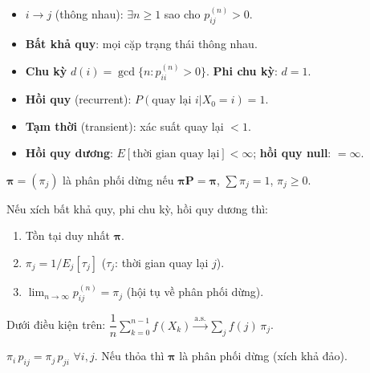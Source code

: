 \documentclass[12pt,a4paper]{article}
\begin{document}
\begin{dinhnghia}[title={Phân loại trạng thái}]
  \begin{itemize}
    \item $i \to j$ (thông nhau): $\exists n \ge 1$ sao cho $p_{ij}^{(n)} > 0$.
    \item \textbf{Bất khả quy}: mọi cặp trạng thái thông nhau.
    \item \textbf{Chu kỳ} $d(i) = \gcd\{n : p_{ii}^{(n)} > 0\}$. \textbf{Phi chu kỳ}: $d = 1$.
    \item \textbf{Hồi quy} (recurrent): $P(\text{quay lại } i | X_0 = i) = 1$.
    \item \textbf{Tạm thời} (transient): xác suất quay lại $< 1$.
    \item \textbf{Hồi quy dương}: $E[\text{thời gian quay lại}] < \infty$; \textbf{hồi quy null}: $= \infty$.
  \end{itemize}
\end{dinhnghia}

\begin{dinhly}[title={Phân phối dừng (stationary distribution)}]
  $\boldsymbol{\pi} = (\pi_j)$ là phân phối dừng nếu $\boldsymbol{\pi}\mathbf{P} = \boldsymbol{\pi}$, $\sum \pi_j = 1$, $\pi_j \ge 0$.

  Nếu xích bất khả quy, phi chu kỳ, hồi quy dương thì:
  \begin{enumerate}
    \item Tồn tại duy nhất $\boldsymbol{\pi}$.
    \item $\pi_j = 1/E_j[\tau_j]$ ($\tau_j$: thời gian quay lại $j$).
    \item $\lim_{n \to \infty} p_{ij}^{(n)} = \pi_j$ (hội tụ về phân phối dừng).
  \end{enumerate}
\end{dinhly}

\begin{dinhly}[title={Định lý Ergodic}]
  Dưới điều kiện trên: $\dfrac{1}{n}\sum_{k=0}^{n-1} f(X_k) \xrightarrow{\text{a.s.}} \sum_j f(j)\,\pi_j$.
\end{dinhly}

\begin{dinhnghia}[title={Cân bằng chi tiết (detailed balance)}]
  $\pi_i\, p_{ij} = \pi_j\, p_{ji}$ $\forall i, j$. Nếu thỏa thì $\boldsymbol{\pi}$ là phân phối dừng (xích khả đảo).
\end{dinhnghia}

\end{document}
